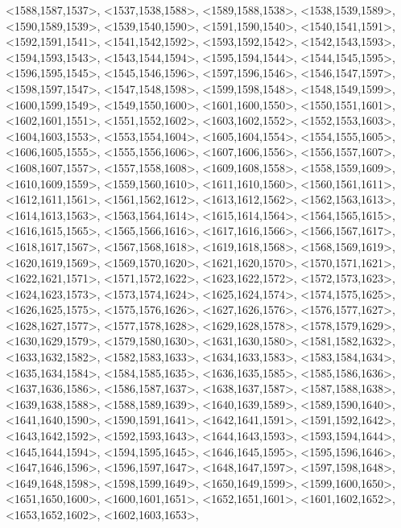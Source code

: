 \documentclass[a4paper,10pt]{article}
\begin{document}
\begin{eulernotebook}
\begin{euleroutput}
  <1588,1587,1537>,
  <1537,1538,1588>,
  <1589,1588,1538>,
  <1538,1539,1589>,
  <1590,1589,1539>,
  <1539,1540,1590>,
  <1591,1590,1540>,
  <1540,1541,1591>,
  <1592,1591,1541>,
  <1541,1542,1592>,
  <1593,1592,1542>,
  <1542,1543,1593>,
  <1594,1593,1543>,
  <1543,1544,1594>,
  <1595,1594,1544>,
  <1544,1545,1595>,
  <1596,1595,1545>,
  <1545,1546,1596>,
  <1597,1596,1546>,
  <1546,1547,1597>,
  <1598,1597,1547>,
  <1547,1548,1598>,
  <1599,1598,1548>,
  <1548,1549,1599>,
  <1600,1599,1549>,
  <1549,1550,1600>,
  <1601,1600,1550>,
  <1550,1551,1601>,
  <1602,1601,1551>,
  <1551,1552,1602>,
  <1603,1602,1552>,
  <1552,1553,1603>,
  <1604,1603,1553>,
  <1553,1554,1604>,
  <1605,1604,1554>,
  <1554,1555,1605>,
  <1606,1605,1555>,
  <1555,1556,1606>,
  <1607,1606,1556>,
  <1556,1557,1607>,
  <1608,1607,1557>,
  <1557,1558,1608>,
  <1609,1608,1558>,
  <1558,1559,1609>,
  <1610,1609,1559>,
  <1559,1560,1610>,
  <1611,1610,1560>,
  <1560,1561,1611>,
  <1612,1611,1561>,
  <1561,1562,1612>,
  <1613,1612,1562>,
  <1562,1563,1613>,
  <1614,1613,1563>,
  <1563,1564,1614>,
  <1615,1614,1564>,
  <1564,1565,1615>,
  <1616,1615,1565>,
  <1565,1566,1616>,
  <1617,1616,1566>,
  <1566,1567,1617>,
  <1618,1617,1567>,
  <1567,1568,1618>,
  <1619,1618,1568>,
  <1568,1569,1619>,
  <1620,1619,1569>,
  <1569,1570,1620>,
  <1621,1620,1570>,
  <1570,1571,1621>,
  <1622,1621,1571>,
  <1571,1572,1622>,
  <1623,1622,1572>,
  <1572,1573,1623>,
  <1624,1623,1573>,
  <1573,1574,1624>,
  <1625,1624,1574>,
  <1574,1575,1625>,
  <1626,1625,1575>,
  <1575,1576,1626>,
  <1627,1626,1576>,
  <1576,1577,1627>,
  <1628,1627,1577>,
  <1577,1578,1628>,
  <1629,1628,1578>,
  <1578,1579,1629>,
  <1630,1629,1579>,
  <1579,1580,1630>,
  <1631,1630,1580>,
  <1581,1582,1632>,
  <1633,1632,1582>,
  <1582,1583,1633>,
  <1634,1633,1583>,
  <1583,1584,1634>,
  <1635,1634,1584>,
  <1584,1585,1635>,
  <1636,1635,1585>,
  <1585,1586,1636>,
  <1637,1636,1586>,
  <1586,1587,1637>,
  <1638,1637,1587>,
  <1587,1588,1638>,
  <1639,1638,1588>,
  <1588,1589,1639>,
  <1640,1639,1589>,
  <1589,1590,1640>,
  <1641,1640,1590>,
  <1590,1591,1641>,
  <1642,1641,1591>,
  <1591,1592,1642>,
  <1643,1642,1592>,
  <1592,1593,1643>,
  <1644,1643,1593>,
  <1593,1594,1644>,
  <1645,1644,1594>,
  <1594,1595,1645>,
  <1646,1645,1595>,
  <1595,1596,1646>,
  <1647,1646,1596>,
  <1596,1597,1647>,
  <1648,1647,1597>,
  <1597,1598,1648>,
  <1649,1648,1598>,
  <1598,1599,1649>,
  <1650,1649,1599>,
  <1599,1600,1650>,
  <1651,1650,1600>,
  <1600,1601,1651>,
  <1652,1651,1601>,
  <1601,1602,1652>,
  <1653,1652,1602>,
  <1602,1603,1653>,

\end{euleroutput}
\end{eulernotebook}
\end{document}
